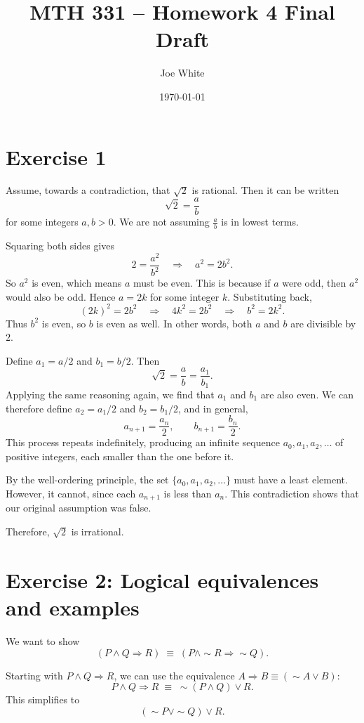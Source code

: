 \documentclass[11pt]{article}
\title{MTH 331 -- Homework 4 Final Draft}
\author{Joe White}
\date{\today}
\begin{document}
\maketitle

\section*{Exercise 1}

Assume, towards a contradiction, that $\sqrt{2}$ is rational. Then it can be written
\[
\sqrt{2} = \frac{a}{b}
\]
for some integers $a,b>0$. We are not assuming $\tfrac{a}{b}$ is in lowest terms.

Squaring both sides gives
\[
2 = \frac{a^2}{b^2} \quad \Rightarrow \quad a^2 = 2b^2.
\]
So $a^2$ is even, which means $a$ must be even. This is because if $a$ were odd, then $a^2$ would also be odd.  
Hence $a=2k$ for some integer $k$. Substituting back,
\[
(2k)^2 = 2b^2 \quad \Rightarrow \quad 4k^2 = 2b^2 \quad \Rightarrow \quad b^2 = 2k^2.
\]
Thus $b^2$ is even, so $b$ is even as well. In other words, both $a$ and $b$ are divisible by $2$.

Define $a_1 = a/2$ and $b_1 = b/2$. Then
\[
\sqrt{2} = \frac{a}{b} = \frac{a_1}{b_1}.
\]
Applying the same reasoning again, we find that $a_1$ and $b_1$ are also even.  
We can therefore define $a_2 = a_1/2$ and $b_2 = b_1/2$, and in general,
\[
a_{n+1} = \frac{a_n}{2}, \qquad b_{n+1} = \frac{b_n}{2}.
\]
This process repeats indefinitely, producing an infinite sequence $a_0, a_1, a_2, \dots$ of positive integers, each smaller than the one before it.

By the well-ordering principle, the set $\{a_0, a_1, a_2, \dots\}$ must have a least element.  
However, it cannot, since each $a_{n+1}$ is less than $a_n$.  
This contradiction shows that our original assumption was false.

Therefore, $\sqrt{2}$ is irrational.

\bigskip

\section*{Exercise 2: Logical equivalences and examples}

We want to show
\[
(P \wedge Q \Rightarrow R) \;\equiv\; (P \wedge \sim R \Rightarrow \sim Q).
\]

Starting with $P \wedge Q \Rightarrow R$, we can use the equivalence $A \Rightarrow B \equiv (\sim A \vee B)$:
\[
P \wedge Q \Rightarrow R \;\equiv\; \sim(P \wedge Q) \vee R.
\]
This simplifies to
\[
(\sim P \vee \sim Q) \vee R.
\]
\end{document}
